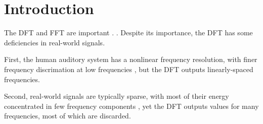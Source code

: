 \documentclass[letter,12pt,notitlepage]{article}
\title{\ThesisTitle}
\author{\vspace{1em}\\Sevag Hanssian \\
  McGill University \\
 \small{\texttt{sevag.hanssian@mail.mcgill.ca}} \\
 \small{\texttt{sevagh@protonmail.com}} \\\ \\\ \\
 \small{Thesis for Master of Arts in Music Technology}\\
 \small{Date TBD, 2021}}
\date{}
\begin{document}
\maketitle

\vspace{3.5em}

\begin{abstract}
	The discrete Fourier transform (DFT), and the Fast Fourier Transform (FFT) algorithm for its efficient computation, rank among the most important algorithms in applied engineering and computer science. The DFT is used in digital signal processing applications to decompose a discrete-time acoustic signal into a sum of its frequency components, generating a spectrum to perform what is known as spectral or frequency analysis. This Master's thesis first proposes to describe and implement the DFT, FFT, and their sparse, pruned, nonuniform, warped, and fractional variants. Next, the use of the standard DFT and FFT in real-world music systems will be revisited to explore whether using the variants can be beneficial. The main result achieved is that a combination of several of the variants showed a simultaneous reduction in computational footprint and improvement in accuracy in a recent state-of-the-art music system.
\end{abstract}

\vfill
\clearpage %

\tableofcontents

\vfill
\clearpage %

\listoffigures

\listoflistings

\vfill
\clearpage %

\section{Introduction}
\label{sec:intro}

The DFT and FFT \cite{cooleytukey} are important \cite{dftimportant}. . Despite its importance, the DFT has some deficiencies in real-world signals.

First, the human auditory system has a nonlinear frequency resolution, with finer frequency discrimation at low frequencies , but the DFT outputs linearly-spaced frequencies.

Second, real-world signals are typically sparse, with most of their energy concentrated in few frequency components \cite{sparseintro}, yet the DFT outputs values for many frequencies, most of which are discarded.
\end{document}
